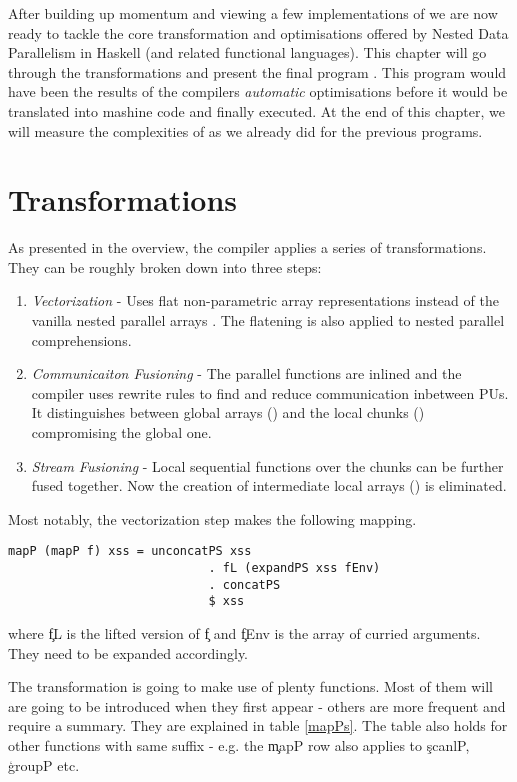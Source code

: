 

  After building up momentum and viewing a few implementations of \algo
  we are now ready to tackle the core transformation and optimisations
  offered by Nested Data Parallelism in Haskell (and related functional languages).
  This chapter will go through the transformations and present the
  final program \ndpv. This program would have been the results of the compilers \textit{automatic}
  optimisations before it would be translated into mashine code and finally executed.
  At the end of this chapter, we will measure the complexities of \ndpv as we already did for the previous programs.
  
  \section{Transformations}
    As presented in the overview, the compiler applies a series of transformations. They can be
    roughly broken down into three steps:
    \begin{enumerate}
      \item \emph{Vectorization} - Uses flat non-parametric array \pav representations instead of the
            vanilla nested parallel arrays \pan . The flatening is also applied to nested parallel comprehensions.
      \item \emph{Communicaiton Fusioning} - The parallel functions are inlined and the compiler uses rewrite rules to
            find and reduce communication inbetween PUs. It distinguishes between global arrays (\pav) and the local chunks (\pad)
            compromising the global one.
      \item \emph{Stream Fusioning} - Local sequential functions over the chunks can be further fused together. Now
            the creation of intermediate local arrays (\pad) is eliminated.
    \end{enumerate}
    
    Most notably, the vectorization step makes the following mapping.
    \begin{lstlisting}
mapP (mapP f) xss = unconcatPS xss
                            . fL (expandPS xss fEnv)
                            . concatPS
                            $ xss
    \end{lstlisting}
    where \c{fL} is the lifted version of \c{f} and \c{fEnv} is
    the array of curried arguments. They need to be expanded accordingly.
    
    The transformation is going to make use of plenty functions. Most of them will are going to be
    introduced when they first appear - others are more frequent and require a summary. They are explained in table \ref{mapPs}.
    The table also holds for other functions with same suffix - e.g. the \c{mapP} row also applies to \c{scanlP}, \c{groupP} etc.
    
